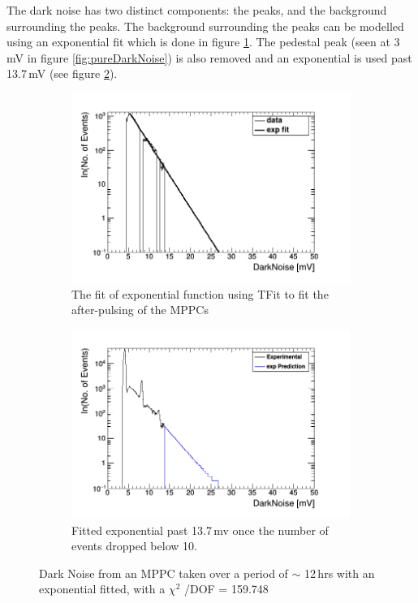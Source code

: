 The dark noise has two distinct components: the peaks, and the background surrounding the peaks. The background surrounding the peaks can be modelled using an exponential fit which is done in figure \ref{subFig:expFitOfDark}. The pedestal peak (seen at 3\,mV in figure \ref{fig:pureDarkNoise}) is also removed and an exponential is used past 13.7\,mV (see figure \ref{subFig:fittedDarkNoise}). 
\begin{figure}[!h]
\centering
\begin{subfigure}{.5\textwidth}
  \centering
  \includegraphics[width=\linewidth]{fit_of_dark_noise.png}
  \captionsetup{width=.9\linewidth}
  \caption{The fit of exponential function using TFit to fit the after-pulsing of the MPPCs}
  \label{subFig:expFitOfDark}
\end{subfigure}%
\begin{subfigure}{.5\textwidth}
  \centering
  \includegraphics[width=\linewidth]{fittedDarkNoise_output.png}
  \captionsetup{width=.9\linewidth}
  \caption{Fitted exponential past 13.7\,mv once the number of events dropped below 10.}
  \label{subFig:fittedDarkNoise}
\end{subfigure}
\caption{Dark Noise from an MPPC taken over a period of $\sim$ 12\,hrs with an exponential fitted, with a $\chi ^2$ /DOF = 159.748}
\label{fig:fitting_of_non_peak_dark_noise}
\end{figure}

